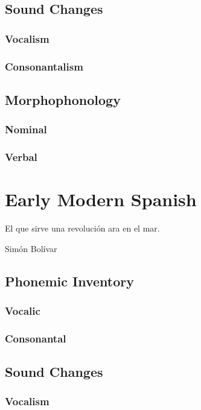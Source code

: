 \documentclass{report}
\begin{document}
\section{Sound Changes}

\subsection{Vocalism}

\subsection{Consonantalism}

\section{Morphophonology}

\subsection{Nominal}

\subsection{Verbal}

\chapter{Early Modern Spanish}

\epigraph{El que sirve una revolución ara en el mar.}{Simón Bolívar}

\section{Phonemic Inventory}

\subsection{Vocalic}

\subsection{Consonantal}

\section{Sound Changes}

\subsection{Vocalism}
\end{document}

